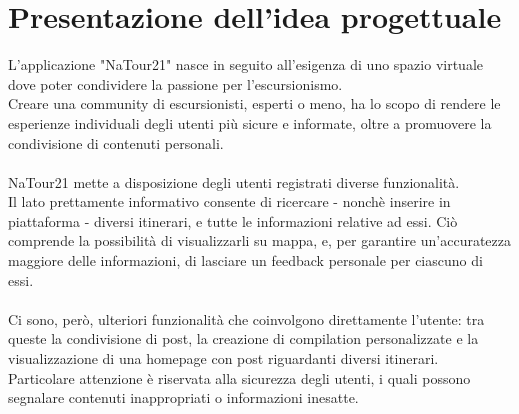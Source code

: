 \documentclass{natourDoc}
\begin{document}
	\section{Presentazione dell'idea progettuale}

	L'applicazione "NaTour21" nasce in seguito all'esigenza di uno spazio virtuale dove poter condividere la passione per l'escursionismo.\\
	Creare una community di escursionisti, esperti o meno, ha lo scopo di rendere le esperienze individuali degli utenti più sicure e informate, 
	oltre a promuovere la condivisione di contenuti personali.\\\\
	NaTour21 mette a disposizione degli utenti registrati diverse funzionalità.\\
	Il lato prettamente informativo consente di ricercare - nonchè inserire in piattaforma - diversi itinerari, e tutte le informazioni relative ad essi.
	Ciò comprende la possibilità di visualizzarli su mappa, e, per garantire un'accuratezza maggiore delle informazioni, di lasciare 
	un feedback personale per ciascuno di essi.\\\\
	Ci sono, però, ulteriori funzionalità che coinvolgono direttamente l'utente: tra queste la condivisione di post, la creazione di compilation personalizzate e 
	la visualizzazione di una homepage con post riguardanti diversi itinerari.\\
	Particolare attenzione è riservata alla sicurezza degli utenti, i quali possono segnalare contenuti inappropriati o informazioni inesatte.
	
\end{document}
